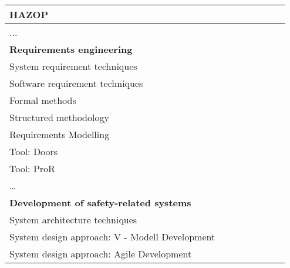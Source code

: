 \documentclass[a4paper, 11pt]{article}
\begin{document}
\begin{center}
\begin{longtable}{|r|r|r|r|r|r|r|r|}
    \hline
    \multicolumn{1}{|l|}{HAZOP} & \multicolumn{1}{c|}{} &       &       &       &       &       &  \bigstrut\\
    \hline
    \multicolumn{1}{|l|}{...} & \multicolumn{1}{c|}{} &       &       &       &       &       &  \bigstrut[t]\\
    \multicolumn{1}{|l|}{\textbf{Requirements engineering}} & \multicolumn{1}{l|}{\textbf{}} &       &       &       &       &       &  \\
    \multicolumn{1}{|l|}{System requirement techniques} & \multicolumn{1}{l|}{} &       &       &       &       &       &  \bigstrut[b]\\
    \hline
    \multicolumn{1}{|l|}{Software requirement techniques} & \multicolumn{1}{l|}{} &       &       &       &       &       &  \bigstrut\\
    \hline
    \multicolumn{1}{|l|}{Formal methods} & \multicolumn{1}{l|}{} &       &       &       &       &       &  \bigstrut\\
    \hline
    \multicolumn{1}{|l|}{Structured methodology} & \multicolumn{1}{l|}{} &       &       &       &       &       &  \bigstrut\\
    \hline
    \multicolumn{1}{|l|}{Requirements Modelling} & \multicolumn{1}{l|}{} &       &       &       &       &       &  \bigstrut\\
    \hline
    \multicolumn{1}{|l|}{Tool: Doors } & \multicolumn{1}{l|}{} &       &       &       &       &       &  \bigstrut\\
    \hline
    \multicolumn{1}{|l|}{Tool: ProR} & \multicolumn{1}{l|}{} &       &       &       &       &       &  \bigstrut\\
    \hline
    \multicolumn{1}{|l|}{…} & \multicolumn{1}{l|}{} &       &       &       &       &       &  \bigstrut[t]\\
    \multicolumn{1}{|l|}{\textbf{Development of safety-related systems}} & \multicolumn{1}{c|}{\textbf{}} &       &       &       &       &       &  \\
    \multicolumn{1}{|l|}{System architecture techniques} & \multicolumn{1}{c|}{} &       &       &       &       &       &  \bigstrut[b]\\
    \hline
    \multicolumn{1}{|l|}{System design approach: V - Modell Development} & \multicolumn{1}{c|}{} &       &       &       &       &       &  \bigstrut\\
    \hline
    \multicolumn{1}{|l|}{System design approach: Agile Development} & \multicolumn{1}{c|}{} &       &       &       &       &       &  \bigstrut\\

\end{longtable}
\end{center}
\end{document}
